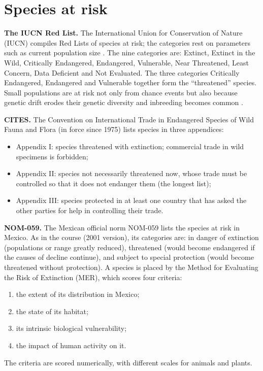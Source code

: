 \section{Species at risk}
\label{section-species-at-risk}

\textbf{The IUCN Red List.}
The International Union for Conservation of
Nature (IUCN) compiles Red Lists of species
at risk; the categories rest on parameters
such as current population size
\cite[Chapter 7]{freeland2005molecular}. The
nine categories
are: Extinct, Extinct in the Wild,
Critically Endangered, Endangered,
Vulnerable, Near Threatened, Least Concern,
Data Deficient and Not Evaluated. The three
categories Critically Endangered, Endangered
and Vulnerable together form the
``threatened'' species. Small populations are
at risk not only from chance events but also
because genetic drift erodes their genetic
diversity and inbreeding becomes common
\cite[Chapter 7]{freeland2005molecular}.

\textbf{CITES.}
The Convention on International Trade in
Endangered Species of Wild Fauna and Flora
(in force since 1975) lists species in three
appendices:
\begin{itemize}
\item Appendix I: species threatened with
extinction; commercial trade in wild
specimens is forbidden;
\item Appendix II: species not necessarily
threatened now, whose trade must be
controlled so that it does not endanger
them (the longest list);
\item Appendix III: species protected in at
least one country that has asked the other
parties for help in controlling their
trade.
\end{itemize}

\textbf{NOM-059.}
The Mexican official norm NOM-059 lists the
species at risk in Mexico. As in the course
(2001 version), its categories are: in
danger of extinction (populations or range
greatly reduced), threatened (would become
endangered if the causes of decline
continue), and subject to special
protection (would become threatened without
protection). A species is placed by the
Method for Evaluating the Risk of
Extinction (MER), which scores four
criteria:
\begin{enumerate}
\item the extent of its distribution in
Mexico;
\item the state of its habitat;
\item its intrinsic biological
vulnerability;
\item the impact of human activity on it.
\end{enumerate}
The criteria are scored numerically, with
different scales for animals and plants.

